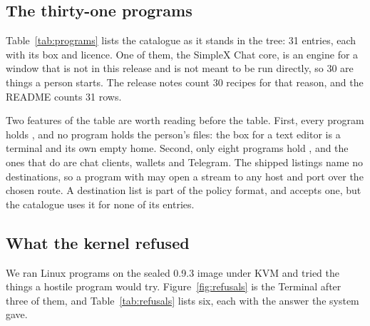 \subsection{The thirty-one programs}

Table~\ref{tab:programs} lists the catalogue as it stands in the tree: 31 entries, each with its box and licence. One of them, the SimpleX Chat core, is an engine for a window that is not in this release and is not meant to be run directly, so 30 are things a person starts. The release notes count 30 recipes for that reason, and the README counts 31 rows.

Two features of the table are worth reading before the table. First, every program holds , and no program holds the person's files: the box for a text editor is a terminal and its own empty home. Second, only eight programs hold , and the ones that do are chat clients, wallets and Telegram. The shipped listings name no destinations, so a program with  may open a stream to any host and port over the chosen route. A destination list is part of the policy format, and  accepts one, but the catalogue uses it for none of its entries.

\begin{table}[t]
\centering
\caption{The \nPrograms{} programs in the Marketplace catalogue with their boxes, grouped by what they draw. Generated from  by . Twenty-five come from Alpine v3.20 packages. The other six are not Alpine packages: DarkFi's four are built from source at a pinned commit, and SimpleX's two are the upstream release binary pinned by hash. A listing in this table is not evidence that the program has run: the status of each is in Section~\ref{sec:status}.}
\label{tab:programs}

\end{table}

\subsection{What the kernel refused}

We ran Linux programs on the sealed 0.9.3 image under KVM and tried the things a hostile program would try. Figure~\ref{fig:refusals} is the Terminal after three of them, and Table~\ref{tab:refusals} lists six, each with the answer the system gave.

